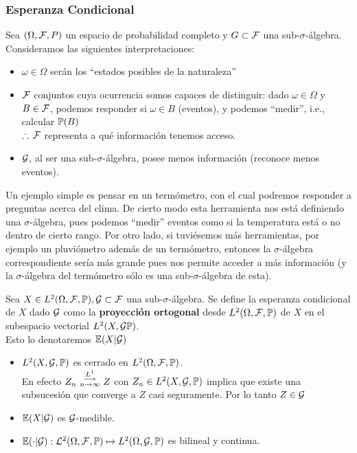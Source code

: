 \subsubsection{Esperanza Condicional} %
Sea $(\Omega,\F,P)$ un espacio de probabilidad completo y $G\subset \F$ una sub-$\sigma$-álgebra. Consideramos las siguientes interpretaciones:
\begin{itemize}
    \item $\omega\in\Omega$ serán los ``estados posibles de la naturaleza''
    \item $\F$ conjuntos cuya ocurrencia somos capaces de distinguir: dado $\omega \in\Omega$ y $B\in\F$, podemos responder si $\omega\in B$ (eventos), y podemos ``medir'', i.e., calcular $\P(B)$ \\
    $\therefore\,\F$ representa a qué información tenemos acceso.
    \item $\G$, al ser una sub-$\sigma$-álgebra, posee menos información (reconoce menos eventos).
\end{itemize}
Un ejemplo simple es pensar en un termómetro, con el cual podremos responder a preguntas acerca del clima. De cierto modo esta herramienta nos está definiendo una $\sigma$-álgebra, pues podemos ``medir'' eventos como si la temperatura está o no dentro de cierto rango. Por otro lado, si tuviésemos más herramientas, por ejemplo un pluviómetro además de un termómetro, entonces la $\sigma$-álgebra correspondiente sería más grande pues nos permite acceder a más información (y la $\sigma$-álgebra del termómetro sólo es una sub-$\sigma$-álgebra  de esta).
\begin{definition}
Sea $X\in L^2\edp, \G\subset\F$ una sub-$\sigma$-álgebra. Se define la esperanza condicional de $X$ dado $\G$ como la \textbf{proyección ortogonal} desde $L^2\edp$ de $X$ en el subespacio vectorial $L^2(X,\G\P)$.
\\ Esto lo denotaremos $\E(X|\G)$
\end{definition}
\begin{remark}
\beforeitemize
\begin{itemize}
    \item $L^2(X,\G,\P)$ es cerrado en $L^2\edp$.
    \\ En efecto $Z_n\convldos Z$ con $Z_n\in L^2(X,\G,\P)$ implica que existe una subsucesión que converge a $Z$ casi seguramente. Por lo tanto $Z\in\G$
    \item $\E(X|\G)$ es $\G$-medible.
    \item $\E(\cdot|\G):\L^2\edp\mapsto L^2(\Omega,\G,\P)$ es bilineal y continua.
\end{itemize}

\end{remark}
